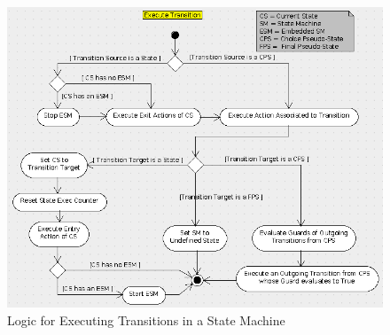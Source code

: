 \documentclass[a4paper,10pt]{article}
\begin{document}
\begin{figure}[h]
 \centering
 \includegraphics[scale=0.465,keepaspectratio=true]{../images/SM_TransitionExecution.png}
 \caption{Logic for Executing Transitions in a State Machine}
 \label{fig:SmExecutingTransCmd}
\end{figure}

\newpage
\end{document}
